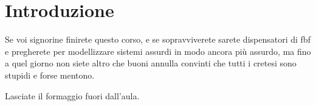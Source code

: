
\chapter{Introduzione}

\label{cap:introduction}



Se voi signorine finirete questo corso, e se sopravviverete sarete
dispensatori di fbf e pregherete per modellizzare sistemi assurdi
in modo ancora più assurdo, ma fino a quel giorno non siete altro
che buoni annulla convinti che tutti i cretesi sono stupidi e forse
mentono.

Lasciate il formaggio fuori dall'aula. 
